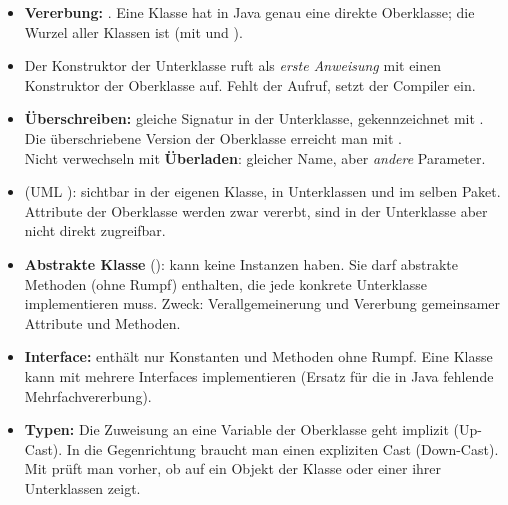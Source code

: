 \begin{merke}
\begin{itemize}[itemsep=0.1em]
\item \textbf{Vererbung:} . Eine Klasse hat in Java genau eine direkte Oberklasse; die Wurzel aller Klassen ist  (mit  und ).
\item Der Konstruktor der Unterklasse ruft als \emph{erste Anweisung} mit  einen Konstruktor der Oberklasse auf. Fehlt der Aufruf, setzt der Compiler  ein.
\item \textbf{Überschreiben:} gleiche Signatur in der Unterklasse, gekennzeichnet mit . Die überschriebene Version der Oberklasse erreicht man mit . \\
Nicht verwechseln mit \textbf{Überladen}: gleicher Name, aber \emph{andere} Parameter.
\item {} (UML \code{\#}): sichtbar in der eigenen Klasse, in Unterklassen und im selben Paket. \\
 Attribute der Oberklasse werden zwar vererbt, sind in der Unterklasse aber nicht direkt zugreifbar.
\item \textbf{Abstrakte Klasse} (): kann keine Instanzen haben. Sie darf abstrakte Methoden (ohne Rumpf) enthalten, die jede konkrete Unterklasse implementieren muss. Zweck: Verallgemeinerung und Vererbung gemeinsamer Attribute und Methoden.
\item \textbf{Interface:} enthält nur Konstanten und Methoden ohne Rumpf. Eine Klasse kann mit  mehrere Interfaces implementieren (Ersatz für die in Java fehlende Mehrfachvererbung).
\item \textbf{Typen:} Die Zuweisung an eine Variable der Oberklasse geht implizit (Up-Cast). In die Gegenrichtung braucht man einen expliziten Cast (Down-Cast). Mit  prüft man vorher, ob  auf ein Objekt der Klasse  oder einer ihrer Unterklassen zeigt.
\end{itemize}
\end{merke}

